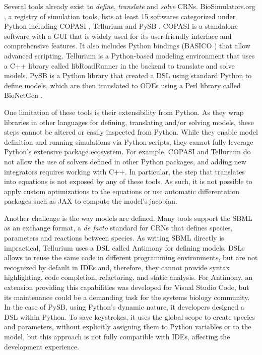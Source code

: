 \documentclass{article}
\begin{document}
Several tools already exist to \emph{define}, \emph{translate} and \emph{solve} \acp{CRN}.
BioSimulators.org \cite{shaikhBioSimulatorsCentralRegistry2022},
a registry of simulation tools,
lists at least 15 softwares categorized under Python including
COPASI \cite{hoopsCOPASICOmplexPAthway2006},
Tellurium \cite{choiTelluriumExtensiblePythonbased2018} and
PySB \cite{lopezProgrammingBiologicalModels2013}.
COPASI is a standalone software with a \ac{GUI}
that is widely used for its user-friendly interface and comprehensive features.
It also includes Python bindings (BASICO \cite{bergmannBASICOSimplifiedPython2023b}) that allow advanced scripting.
Tellurium is a Python-based modeling environment
that uses a C++ library called libRoadRunner \cite{welshLibRoadRunnerHighPerformance2023} in the backend to translate and solve models.
PySB is a Python library that created a \ac{DSL} using standard Python to define models,
which are then translated to \acp{ODE} using a Perl library called BioNetGen \cite{harrisBioNetGenAdvancesRulebased2016}.

One limitation of these tools is their extensibility from Python.
As they wrap libraries in other languages for defining, translating and/or solving models,
these steps cannot be altered or easily inspected from Python.
While they enable model definition and running simulations via Python scripts,
they cannot fully leverage Python's extensive package ecosystem.
For example,
COPASI and Tellurium do not allow the use of solvers defined in other Python packages,
and adding new integrators requires working with C++.
In particular, the step that translates into equations is not exposed by any of these tools.
As such, it is not possible to apply custom optimizations to the equations
or use automatic differentation packages such as JAX \cite{jax2018github} to compute the model's jacobian.

Another challenge is the way models are defined.
Many tools support the \ac{SBML} \cite{huckaSBMLL3V2} as an exchange format,
a \emph{de facto} standard for \acp{CRN} that defines species, parameters and reactions between species.
As writing \ac{SBML} directly is impractical,
Tellurium uses a \ac{DSL} called Antimony \cite{smithAntimonyModularModel2009} for defining models.
\Acp{DSL} allows to reuse the same code in different programming environments,
but are not recognized by default in \acp{IDE}
and, therefore, they cannot provide syntax highlighting, code completion, refactoring, and static analysis.
For Antimony, an extension providing this capabilities was developed for Visual Studio Code,
but its maintenance could be a demanding task for the systems biology community.
In the case of PySB,
using Python's dynamic nature,
it developers designed a \ac{DSL} within Python.
To save keystrokes,
it uses the global scope to create species and parameters,
without explicitly assigning them to Python variables or to the model,
but this approach is not fully compatible with \acp{IDE},
affecting the development experience.
\end{document}
